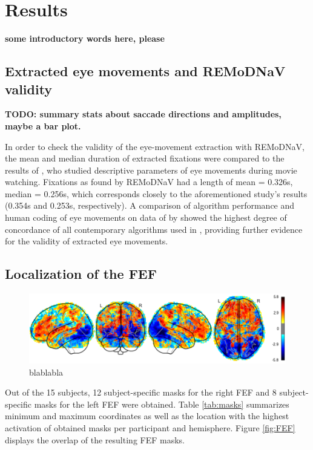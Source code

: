 \documentclass[a4paper, 12pt]{scrreprt}
\begin{document}
\section{Results}
\textbf{some introductory words here, please}

\subsection{Extracted eye movements and REMoDNaV validity}

\textbf{TODO: summary stats about saccade directions and amplitudes, maybe a bar plot.}

In order to check the validity of the eye-movement extraction with REMoDNaV, the mean and median duration of extracted fixations were compared to the results of \textcite{dorr2010variability}, who studied descriptive parameters of eye movements during movie watching. Fixations as found by REMoDNaV had a length of mean = 0.326s, median = 0.256s, which corresponds closely to the aforementioned study's results (0.354s and 0.253s, respectively). A comparison of algorithm performance and human coding of eye movements on data of \textcite{andersson2017one} by \textcite{dar2019} showed the highest degree of concordance of all contemporary algorithms used in \textcite{anderson2015comparison}, providing further evidence for the validity of extracted eye movements. \newline

\subsection{Localization of the FEF}

\begin{figure}[h]
	\includegraphics[scale=0.6]{img/3rdlvl_fitlins.png}
	\caption[GLM results with fitlins]{\small{blablabla}}
\end{figure}

Out of the 15 subjects, 12 subject-specific masks for the right FEF and 8 subject-specific masks for the left FEF were obtained. Table \ref{tab:masks} summarizes minimum and maximum coordinates as well as the location with the highest activation of obtained masks per participant and hemisphere. Figure \ref{fig:FEF} displays the overlap of the resulting FEF masks.
\end{document}
